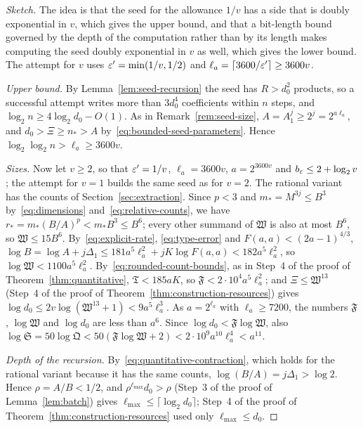 \begin{proof}[Sketch]
The idea is that the seed for the allowance \(1/v\) has a side that is
doubly exponential in \(v\), which gives the upper bound, and that a
bit-length bound governed by the depth of the computation rather than
by its length makes computing the seed doubly exponential in \(v\) as
well, which gives the lower bound. The attempt for \(v\) uses
\(\varepsilon'=\min(1/v,1/2)\) and \(\ell_a=\lceil3600/\varepsilon'\rceil\ge3600v\).

\emph{Upper bound.} By Lemma~\ref{lem:seed-recursion} the seed has
\(R>d_0^2\) products, so a successful attempt writes more than
\(3d_0^4\) coefficients within \(n\) steps, and
\(\log_2n\ge4\log_2d_0-O(1)\). As in Remark~\ref{rem:seed-size},
\(A=A_1^j\ge2^j=2^{a\ell_a}\), and \(d_0>\Xi\ge n_*>A\)
by~\eqref{eq:bounded-seed-parameters}. Hence
\(\log_2\log_2n>\ell_a\ge3600v\).

\emph{Sizes.} Now let \(v\ge2\), so that \(\varepsilon'=1/v\),
\(\ell_a=3600v\), \(a=2^{3600v}\) and \(b_\varepsilon\le2+\log_2v\); the
attempt for \(v=1\) builds the same seed as for \(v=2\). The rational
variant has the counts of Section~\ref{sec:extraction}. Since \(p<3\)
and \(m_*=M^{3j}\le B^3\) by~\eqref{eq:dimensions}
and~\eqref{eq:relative-counts}, we have
\(r_*=m_*(B/A)^p<m_*B^3\le B^6\); every other summand of
\(\mathfrak W\) is also at most \(B^6\), so
\(\mathfrak W\le15B^6\). By~\eqref{eq:explicit-rate},
\eqref{eq:type-error} and \(F(a,a)<(2a-1)^{4/3}\),
\(\log B=\log A+j\Delta_1\le181a^5\ell_a^2+jK\log F(a,a)
<182a^5\ell_a^2\), so \(\log\mathfrak W<1100a^5\ell_a^2\).
By~\eqref{eq:rounded-count-bounds}, as in Step~4 of the proof of
Theorem~\ref{thm:quantitative}, \(\mathfrak T<185aK\), so
\(\mathfrak F<2\cdot10^4a^5\ell_a^2\); and \(\Xi\le\mathfrak W^{13}\)
(Step~4 of the proof of Theorem~\ref{thm:construction-resources}) gives
\(\log d_0\le2v\log(\mathfrak W^{13}+1)<9a^5\ell_a^3\). As
\(a=2^{\ell_a}\) with \(\ell_a\ge7200\), the numbers \(\mathfrak F\),
\(\log\mathfrak W\) and \(\log d_0\) are less than \(a^6\). Since
\(\log d_0<\mathfrak F\log\mathfrak W\), also
\(\log\mathfrak S=50\log\mathfrak Q<50(\mathfrak F\log\mathfrak W+2)
<2\cdot10^9a^{10}\ell_a^4<a^{11}\).

\emph{Depth of the recursion.} By~\eqref{eq:quantitative-contraction},
which holds for the rational variant because it has the same counts,
\(\log(B/A)=j\Delta_1>\log2\). Hence \(\rho=A/B<1/2\), and
\(\rho^{\ell_{\max}}d_0>\rho\) (Step~3 of the proof of
Lemma~\ref{lem:batch}) gives \(\ell_{\max}\le\lceil\log_2d_0\rceil\);
Step~4 of the proof of Theorem~\ref{thm:construction-resources} used
only \(\ell_{\max}\le d_0\).


\end{proof}
